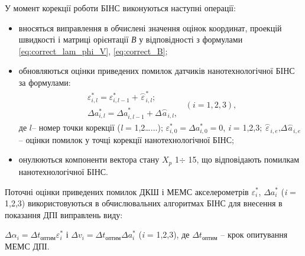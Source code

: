 У момент корекції роботи БІНС виконуються наступні операції:
\begin{itemize}
 \item вносяться виправлення  в обчислені значення оцінок координат, проекцій швидкості 
і матриці орієнтації \textit{В} у відповідності з формулами \eqref{eq:correct_lam_phi_V}, 
\eqref{eq:correct_B};
 \item обновляються оцінки приведених помилок датчиків нанотехнологічної БІНС  за формулами:
\[\begin{array}{l} 
{\varepsilon ^{*}_{i,l} =\varepsilon ^{*}_{i,l-1} +\stackrel{\frown}{\varepsilon 
}^{*}_{i,l} ;} \\ {\Delta a^{*}_{i,l} =\Delta a_{i,l-1} ^{*_{} } +\Delta \stackrel{
\frown}{a}_{i,l} ^{} ,} \end{array}\, \, \, (i=1,2,3),\] 
 де  $l$-- номер точки корекції (\textit{l} = 1,2\dots ...); 
$\varepsilon ^{*}_{i,0} =\Delta a^{*}_{i,0}=0$, \textit{i} = 1,2,3;
$\stackrel{\frown}{\varepsilon }_{i,e} $,$\Delta \stackrel{\frown}{a}_{i,e} $ -- оцінки 
помилок у точці корекції нанотехнологічної БІНС;
 \item онулюються компоненти вектора стану $X_{p}$ 1$\div$ 15, що відповідають помилкам 
нанотехнологічної БІНС.
\end{itemize}
Поточні оцінки приведених помилок ДКШ і МЕМС акселерометрів $\varepsilon_{i}^{*} $, $\Delta 
a_{i}^{*} $ (\textit{i }= 1,2,3)  використовуються в обчислювальних алгоритмах 
БІНС для внесення в показання ДПІ виправлень виду:

$\Delta \alpha_{i} =\Delta t_{\text{оптим}} \varepsilon ^{*}_{i} $ і $\Delta v_{i} 
=\Delta t_{\text{оптим}} \Delta a^{*}_{i} $ (\textit{i }= 1,2,3),
де $\Delta t_{\text{оптим}} $ -- крок опитування МЕМС ДПІ.

